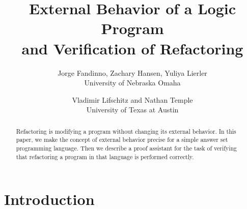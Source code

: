 \documentclass{new_tlp}
\begin{document}
\title[External Behavior and Verification of Refactoring]{\bf External Behavior of a Logic Program\\
  and Verification of Refactoring}
\author[J. Fandinno, Z. Hansen, Yu. Lierler, V. Lifschitz, N. Temple]{Jorge Fandinno, Zachary Hansen, Yuliya Lierler\\
  University of Nebraska Omaha
  \and
  Vladimir Lifschitz and Nathan Temple\\
University of Texas at Austin}
\date{}

\maketitle


\begin{abstract}
  Refactoring is modifying a program without changing its external behavior.
  In this paper, we
  make the concept of external behavior precise for a simple answer set
  programming language.  Then we describe a proof assistant for the
  task of verifying
  that refactoring a program in that language is performed correctly.
\end{abstract}
  
\section{Introduction}
\end{document}
